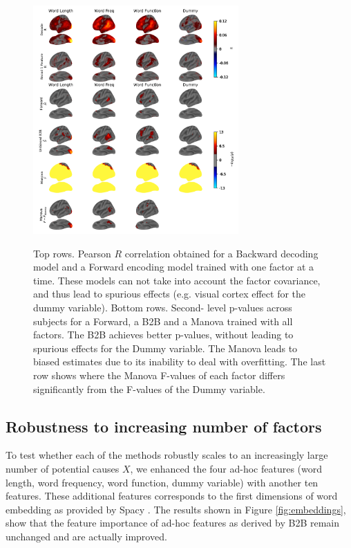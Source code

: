 \begin{figure}
  \begin{center}
    \includegraphics[width=0.7\textwidth,
                     trim=0cm 0cm 0cm 0cm,
                     clip=True]{figures/fmri_controls.pdf}

    \label{fig:fmri_supp}
  \end{center}
  \caption{Top rows. Pearson $R$ correlation obtained for a Backward decoding model and
  a Forward encoding model trained with one factor at a time. These models can
  not take into account the factor covariance, and thus lead to spurious effects
  (e.g. visual cortex effect for the dummy variable). Bottom rows. Second-
  level p-values across subjects for a Forward, a B2B and a Manova trained with
  all factors. The B2B achieves better p-values, without leading to spurious effects for
  the Dummy variable. The Manova leads to biased estimates due to its inability
  to deal with overfitting. The last row shows where the Manova F-values of each factor differs
  significantly from the F-values of the Dummy variable.}
\end{figure}

\subsection{Robustness to increasing number of factors}

To test whether each of the methods robustly scales to an increasingly
large number of potential causes $X$, we enhanced the four ad-hoc features
(word length, word frequency, word function, dummy variable) with another
ten features. These additional features corresponds to the first dimensions
of word embedding as provided by Spacy \citep{spacy2}. The results shown
in Figure \ref{fig:embeddings}, show that the feature importance of ad-hoc
features as derived by B2B remain unchanged and are actually improved.

